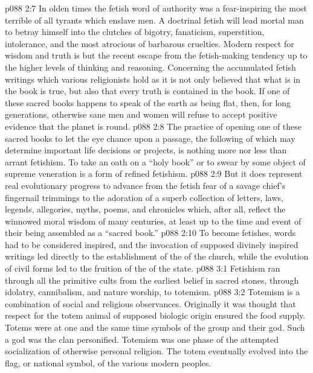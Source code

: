 \vs p088 2:7 In olden times the fetish word of authority was a fear\hyp{}inspiring  the most terrible of all tyrants which enslave men. A doctrinal fetish will lead mortal man to betray himself into the clutches of bigotry, fanaticism, superstition, intolerance, and the most atrocious of barbarous cruelties. Modern respect for wisdom and truth is but the recent escape from the fetish\hyp{}making tendency up to the higher levels of thinking and reasoning. Concerning the accumulated fetish writings which various religionists hold as  it is not only believed that what is in the book is true, but also that every truth is contained in the book. If one of these sacred books happens to speak of the earth as being flat, then, for long generations, otherwise sane men and women will refuse to accept positive evidence that the planet is round.
\vs p088 2:8 The practice of opening one of these sacred books to let the eye chance upon a passage, the following of which may determine important life decisions or projects, is nothing more nor less than arrant fetishism. To take an oath on a “holy book” or to swear by some object of supreme veneration is a form of refined fetishism.
\vs p088 2:9 But it does represent real evolutionary progress to advance from the fetish fear of a savage chief’s fingernail trimmings to the adoration of a superb collection of letters, laws, legends, allegories, myths, poems, and chronicles which, after all, reflect the winnowed moral wisdom of many centuries, at least up to the time and event of their being assembled as a “sacred book.”
\vs p088 2:10 To become fetishes, words had to be considered inspired, and the invocation of supposed divinely inspired writings led directly to the establishment of the  of the church, while the evolution of civil forms led to the fruition of the  of the state.
\vs p088 3:1 Fetishism ran through all the primitive cults from the earliest belief in sacred stones, through idolatry, cannibalism, and nature worship, to totemism.
\vs p088 3:2 Totemism is a combination of social and religious observances. Originally it was thought that respect for the totem animal of supposed biologic origin ensured the food supply. Totems were at one and the same time symbols of the group and their god. Such a god was the clan personified. Totemism was one phase of the attempted socialization of otherwise personal religion. The totem eventually evolved into the flag, or national symbol, of the various modern peoples.

